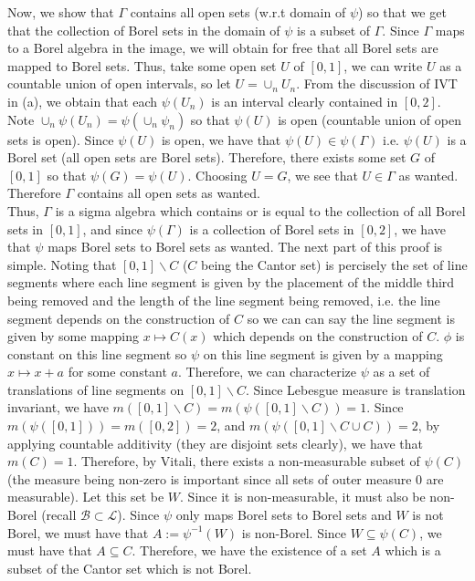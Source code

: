 \documentclass{article}
\begin{document}
    Now, we show that $\Gamma$ contains all open sets (w.r.t domain of $\psi$) so that we get that the collection of Borel sets
    in the domain of $\psi$ is a subset of $\Gamma$. Since $\Gamma$ maps to a Borel algebra in the image, we will obtain for free
    that all Borel sets are mapped to Borel sets. Thus, take some open set $U$ of $[0,1]$, we can write $U$ as a 
    countable union of open intervals, so let $U = \cup_n U_n$. From the discussion of IVT in (a), we obtain that
    each $\psi(U_n)$ is an interval clearly contained in $[0,2]$. Note $\cup_n \psi(U_n) = \psi(\cup_n \psi_n)$ so that $\psi(U)$
    is open (countable union of open sets is open). Since $\psi(U)$ is open, we have that $\psi(U)\in\psi(\Gamma)$ i.e.
    $\psi(U)$ is a Borel set (all open sets are Borel sets). Therefore, there exists some set $G$ of $[0,1]$ so that $\psi(G)
    = \psi(U)$. Choosing $U = G$, we see that $U\in\Gamma$ as wanted. Therefore $\Gamma$ contains all open sets as wanted.\\

    Thus, $\Gamma$ is a sigma algebra which contains or is equal to the collection of all Borel sets in $[0,1]$, and since
    $\psi(\Gamma)$ is a collection of Borel sets in $[0,2]$, we have that $\psi$ maps Borel sets to Borel sets as wanted. The
    next part of this proof is simple. Noting that $[0,1]\backslash C$ ($C$ being the Cantor set) is percisely the set of line
    segments where each line segment is given by the placement of the middle third being removed and the length of the
    line segment being removed, i.e. the line segment depends on the construction of $C$ so we can can say the line segment
    is given by some mapping $x\mapsto C(x)$ which depends on the construction of $C$. $\phi$ is constant on this line segment
    so $\psi$ on this line segment is given by a mapping $x\mapsto x + a$ for some constant $a$. Therefore, we can characterize
    $\psi$ as a set of translations of line segments on $[0,1]\backslash C$. Since Lebesgue measure is translation invariant, we have
    $m([0,1]\backslash C) = m(\psi([0,1]\backslash C)) = 1$. Since $m(\psi([0,1])) = m([0,2]) = 2$, and
    $m(\psi([0,1]\backslash C \cup C)) = 2$, by applying countable additivity (they are disjoint sets clearly), we have that
    $m(C) = 1$. Therefore, by Vitali, there exists a non-measurable subset of $\psi(C)$ (the measure being non-zero is important since
    all sets of outer measure 0 are measurable). Let this set be $W$. Since it is non-measurable, it must also be non-Borel (recall
    $\mathcal{B}\subset\mathcal{L}$). Since
    $\psi$ only maps Borel sets to Borel sets and $W$ is not Borel, we must have that $A := \psi^{-1}(W)$ is non-Borel. Since
    $W\subseteq\psi(C)$, we must have that $A\subseteq C$. Therefore, we have the existence of a set $A$ which is a subset of the
    Cantor set which is not Borel.
\end{document}
